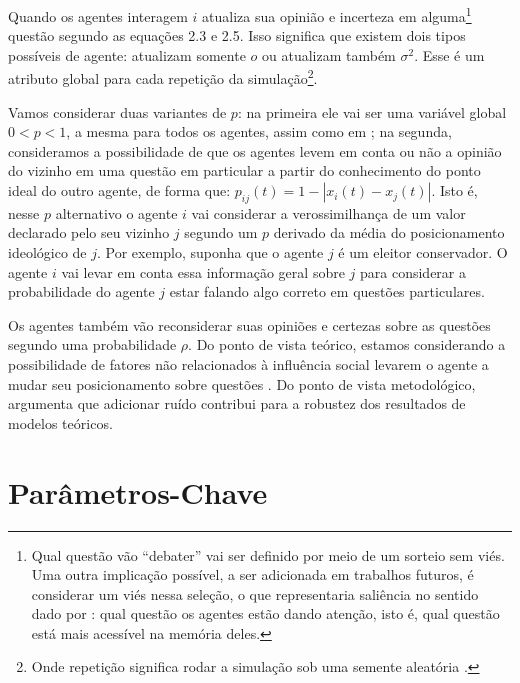 Quando os agentes interagem \(i\) atualiza sua opinião e incerteza em
alguma\footnote{Qual questão vão ``debater'' vai ser definido por meio de um
  sorteio sem viés. Uma outra implicação possível, a ser adicionada em trabalhos
  futuros, é considerar um viés nessa seleção, o que representaria saliência no
  sentido dado por : qual questão os agentes estão
  dando atenção, isto é, qual questão está mais acessível na memória deles.}
questão segundo as equações 2.3 e 2.5. Isso significa que existem dois tipos
possíveis de agente: atualizam somente \(o\) ou atualizam também \(\sigma^2\). Esse é
um atributo global para cada repetição da simulação\footnote{Onde repetição
  significa rodar a simulação sob uma semente aleatória \cite{laver2011party}.}.


Vamos considerar duas variantes de \(p\): na primeira ele vai ser uma variável
global \(0 < p < 1 \), a mesma para todos os agentes, assim como em
; na segunda, consideramos a possibilidade de
que os agentes levem em conta ou não a opinião do vizinho em uma questão em
particular a partir do conhecimento do ponto ideal do outro agente, de forma
que: \(p_{ij}(t) = 1 - |x_i(t) - x_j(t)|\). Isto é, nesse \(p\) alternativo o
agente \(i\) vai considerar a verossimilhança de um valor declarado pelo seu
vizinho \(j\) segundo um \(p\) derivado da média do posicionamento ideológico de
\(j\). Por exemplo, suponha que o agente \(j\) é um eleitor conservador. O
agente \(i\) vai levar em conta essa informação geral sobre \(j\) para
considerar a probabilidade do agente \(j\) estar falando algo correto em
questões particulares.

Os agentes também vão reconsiderar suas opiniões e certezas sobre as questões
segundo uma probabilidade \(\rho\). Do ponto de vista teórico, estamos considerando
a possibilidade de fatores não relacionados à influência social levarem o agente
a mudar seu posicionamento sobre questões \cite{flache2017, lorenz2017modeling}.
Do ponto de vista metodológico,  argumenta que
adicionar ruído contribui para a robustez dos resultados de modelos
teóricos.




\section{Parâmetros-Chave}

